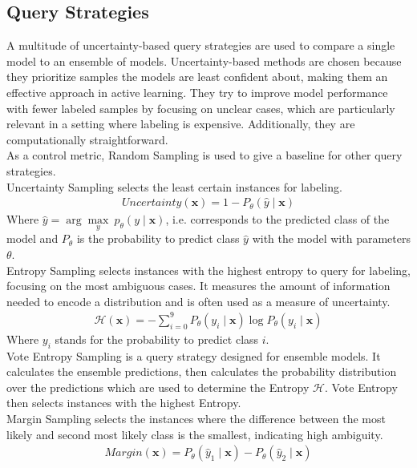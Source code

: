 \documentclass{article}
\theoremstyle{plain}
\theoremstyle{definition}
\theoremstyle{remark}
\begin{document}
\subsection{Query Strategies}
A multitude of uncertainty-based query strategies are used to compare a single model to an ensemble of models. Uncertainty-based methods are chosen because they prioritize samples the models are least confident about, making them an effective approach in active learning. They try to improve model performance with fewer labeled samples by focusing on unclear cases, which are particularly relevant in a setting where labeling is expensive. Additionally, they are computationally straightforward. \\
As a control metric, Random Sampling is used to give a baseline for other query strategies. \\
Uncertainty Sampling selects the least certain instances for labeling.
\begin{align}
	Uncertainty(\mathbf{x})=1-P_\theta(\hat{y} \mid \mathbf{x})
\end{align}
Where $\hat{y}=\operatorname{arg}\underset{y}{\operatorname{max}} \ p_\theta(y \mid \mathbf{x})$, i.e. corresponds to the predicted class of the model and $P_\theta$ is the probability to predict class $\hat{y}$ with the model with parameters $\theta$. \\
Entropy Sampling selects instances with the highest entropy to query for labeling, focusing on the most ambiguous cases. It measures the amount of information needed to encode a distribution and is often used as a measure of uncertainty.
\begin{align}
	\mathcal{H}(\mathbf{x})=-\sum_{i=0}^{9} P_\theta(y_i \mid \mathbf{x}) \log P_\theta(y_i \mid \mathbf{x})
\end{align}
Where $y_i$ stands for the probability to predict class $i$. \\
Vote Entropy Sampling is a query strategy designed for ensemble models. It calculates the ensemble predictions, then calculates the probability distribution over the predictions which are used to determine the Entropy $\mathcal{H}$. Vote Entropy then selects instances with the highest Entropy. \\
Margin Sampling selects the instances where the difference between the most likely and second most likely class is the smallest, indicating high ambiguity.
\begin{align}
	Margin(\mathbf{x})=P_\theta\left(\hat{y}_1 \mid \mathbf{x}\right)-P_\theta\left(\hat{y}_2 \mid \mathbf{x}\right)
\end{align}
\end{document}
